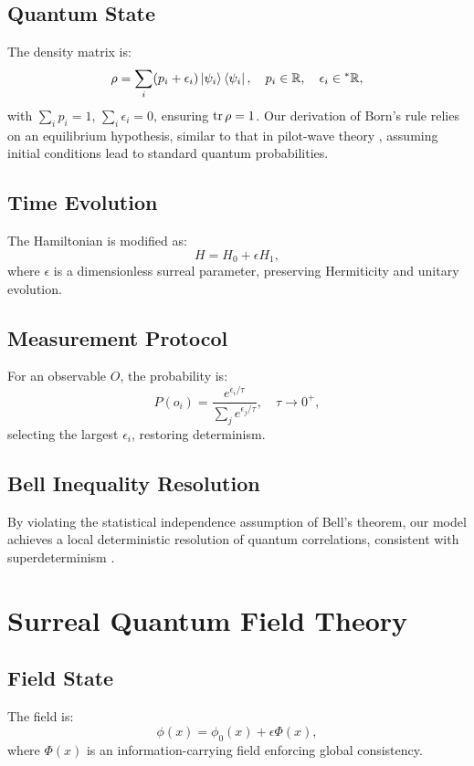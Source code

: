 \documentclass{article}
\begin{document}
\subsection{Quantum State}
The density matrix is:
\begin{equation}
\rho = \sum_i (p_i + \epsilon_i) \ket{\psi_i}\bra{\psi_i}, \quad p_i \in \mathbb{R}, \quad \epsilon_i \in {}^*\mathbb{R},
\end{equation}
with \(\sum_i p_i = 1\), \(\sum_i \epsilon_i = 0\), ensuring \(\tr \rho = 1\). Our derivation of Born's rule relies on an equilibrium hypothesis, similar to that in pilot-wave theory \cite{Valentini2005}, assuming initial conditions lead to standard quantum probabilities.

\subsection{Time Evolution}
The Hamiltonian is modified as:
\begin{equation}
H = H_0 + \epsilon H_1,
\end{equation}
where \(\epsilon\) is a dimensionless surreal parameter, preserving Hermiticity and unitary evolution.

\subsection{Measurement Protocol}
For an observable \(O\), the probability is:
\begin{equation}
P(o_i) = \frac{e^{\epsilon_i / \tau}}{\sum_j e^{\epsilon_j / \tau}}, \quad \tau \to 0^+,
\end{equation}
selecting the largest \(\epsilon_i\), restoring determinism.

\subsection{Bell Inequality Resolution}
By violating the statistical independence assumption of Bell's theorem, our model achieves a local deterministic resolution of quantum correlations, consistent with superdeterminism \cite{Hossenfelder2019}.

\section{Surreal Quantum Field Theory}
\subsection{Field State}
The field is:
\begin{equation}
\phi(x) = \phi_0(x) + \epsilon \Phi(x),
\end{equation}
where \(\Phi(x)\) is an information-carrying field enforcing global consistency.
\end{document}
